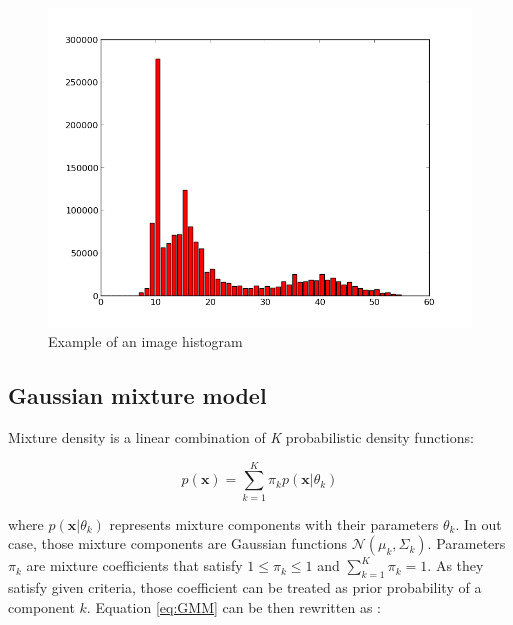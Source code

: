 \begin{figure}
	\begin{center}
		\includegraphics[scale=0.4]{Figures/segmentation/raw_histogram}
		\caption{Example of an image histogram}
		\label{img:Histogram}
	\end{center}
\end{figure}


\subsection{Gaussian mixture model} 

Mixture density is a linear combination of \textit{K} probabilistic density functions:

\begin{equation}
	p(\mathbf{x}) = \sum_{k=1}^{K}\pi_k p(\mathbf{x} | \theta_k)
	\label{eq:GMM}
\end{equation}
	 
where $p(\mathbf{x} | \theta_k)$ represents mixture components with their parameters $\theta_k$. In out case, those mixture components are Gaussian functions $\mathcal{N}(\mu_k, \Sigma_k)$. Parameters $\pi_k$ are mixture coefficients that satisfy $1 \leq \pi_k \leq 1$ and $\sum_{k=1}^{K} \pi_k = 1$. As they satisfy given criteria, those coefficient can be treated as prior probability of a component $k$. Equation \ref{eq:GMM} can be then rewritten as :

